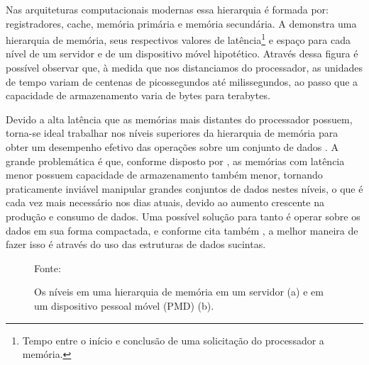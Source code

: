 Nas arquiteturas computacionais modernas essa hierarquia é formada por: registradores, cache, memória primária e memória secundária. A   demonstra uma hierarquia de memória, seus respectivos valores de latência\footnote{Tempo entre o início e conclusão de uma solicitação do processador a memória.}  e espaço para cada nível de um servidor e de um dispositivo móvel hipotético. Através dessa figura é possível observar que, à medida que nos distanciamos do processador, as unidades de tempo variam de centenas de picossegundos até milissegundos, ao passo que a capacidade de armazenamento varia de bytes para terabytes.

Devido  a alta latência que as memórias mais distantes do processador possuem, torna-se ideal trabalhar nos níveis superiores da hierarquia de memória para obter um desempenho efetivo das operações sobre um conjunto de dados  \citep{book-compact-data-structures}. A grande problemática é que, conforme disposto por \cite{paper-gap-between-processor-memory}, as memórias com latência menor possuem capacidade de armazenamento também menor, tornando praticamente inviável manipular grandes conjuntos de dados nestes níveis, o que é cada vez mais necessário nos dias atuais, devido ao aumento crescente na produção e consumo de dados. Uma possível solução para tanto é operar sobre os dados em sua forma compactada, e conforme cita também \cite{coira-feranando}, a melhor maneira de fazer isso é através do uso das estruturas de dados sucintas.
\begin{figure}[!ht]
\centering
  \caption[Exemplos de representação gráficas de árvores]{Os níveis em uma hierarquia de memória em um servidor (a) e em um dispositivo pessoal móvel (PMD) (b).}
  \qquad
  \footnotesize{Fonte: \citet{book-computer-architecutre}}
  \label{fig:hierarquia-de-memoria}
\end{figure}
